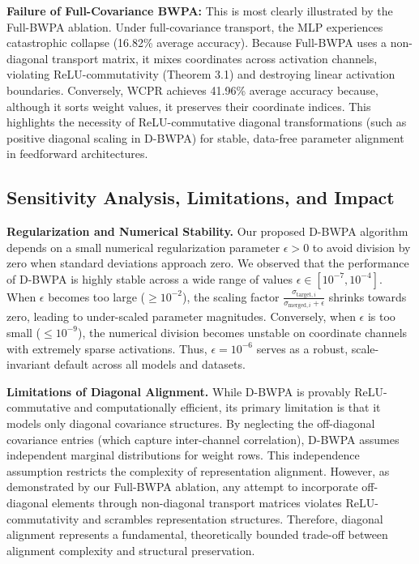 \documentclass{article}
\theoremstyle{plain}
\theoremstyle{definition}
\theoremstyle{remark}
\begin{document}
\textbf{Failure of Full-Covariance BWPA:} This is most clearly illustrated by the Full-BWPA ablation. Under full-covariance transport, the MLP experiences catastrophic collapse (16.82\% average accuracy). Because Full-BWPA uses a non-diagonal transport matrix, it mixes coordinates across activation channels, violating ReLU-commutativity (Theorem 3.1) and destroying linear activation boundaries. Conversely, WCPR achieves 41.96\% average accuracy because, although it sorts weight values, it preserves their coordinate indices. This highlights the necessity of ReLU-commutative diagonal transformations (such as positive diagonal scaling in D-BWPA) for stable, data-free parameter alignment in feedforward architectures.

\subsection{Sensitivity Analysis, Limitations, and Impact}
\label{sec:discussion}

\textbf{Regularization and Numerical Stability.}
Our proposed D-BWPA algorithm depends on a small numerical regularization parameter $\epsilon > 0$ to avoid division by zero when standard deviations approach zero. We observed that the performance of D-BWPA is highly stable across a wide range of values $\epsilon \in [10^{-7}, 10^{-4}]$. When $\epsilon$ becomes too large ($\ge 10^{-2}$), the scaling factor $\frac{\sigma_{\text{target}, i}}{\sigma_{\text{merged}, i} + \epsilon}$ shrinks towards zero, leading to under-scaled parameter magnitudes. Conversely, when $\epsilon$ is too small ($\le 10^{-9}$), the numerical division becomes unstable on coordinate channels with extremely sparse activations. Thus, $\epsilon = 10^{-6}$ serves as a robust, scale-invariant default across all models and datasets.

\textbf{Limitations of Diagonal Alignment.}
While D-BWPA is provably ReLU-commutative and computationally efficient, its primary limitation is that it models only diagonal covariance structures. By neglecting the off-diagonal covariance entries (which capture inter-channel correlation), D-BWPA assumes independent marginal distributions for weight rows. This independence assumption restricts the complexity of representation alignment. However, as demonstrated by our Full-BWPA ablation, any attempt to incorporate off-diagonal elements through non-diagonal transport matrices violates ReLU-commutativity and scrambles representation structures. Therefore, diagonal alignment represents a fundamental, theoretically bounded trade-off between alignment complexity and structural preservation.
\end{document}

